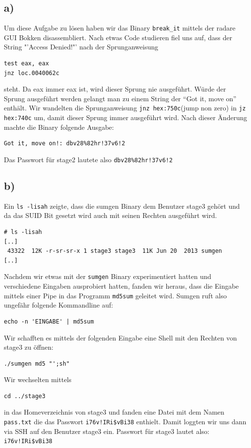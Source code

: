 \documentclass[10pt,a4paper]{article}
\begin{document}
\subsection*{a)}
Um diese Aufgabe zu lösen haben wir das Binary \texttt{break\_it} mittels der radare GUI Bokken disassembliert. Nach etwas Code studieren fiel uns auf, dass der String "'Access Denied!"' nach der Sprunganweisung 
\begin{verbatim}
test eax, eax
jnz loc.0040062c
\end{verbatim}  
steht. Da eax immer eax ist, wird dieser Sprung nie ausgeführt. Würde der Sprung ausgeführt werden gelangt man zu einem String der "`Got it, move on"' enthält. Wir wandelten die Sprunganweisung \texttt{jnz hex:750c}(jump non zero) in \texttt{jz hex:740c} um, damit dieser Sprung immer ausgeführt wird.
Nach dieser Änderung machte die Binary folgende Ausgabe:
\begin{verbatim}
Got it, move on!: dbv28%82hr!37v6!2
\end{verbatim}
Das Passwort für stage2 lautete also \texttt{dbv28\%82hr!37v6!2}

\subsection*{b)}
Ein \texttt{ls -lisah} zeigte, dass die sumgen Binary dem Benutzer stage3 gehört und da das SUID Bit gesetzt wird auch mit seinen Rechten ausgeführt wird.
\begin{verbatim}
# ls -lisah
[..]
 43322  12K -r-sr-sr-x 1 stage3 stage3  11K Jun 20  2013 sumgen
[..]
\end{verbatim}
Nachdem wir etwas mit der \texttt{sumgen} Binary experimentiert hatten und verschiedene Eingaben ausprobiert hatten, fanden wir heraus, dass die Eingabe mittels einer Pipe in das Programm \texttt{md5sum} geleitet wird.
Sumgen ruft also ungefähr folgende Kommandline auf:
\begin{verbatim}
echo -n 'EINGABE' | md5sum 
\end{verbatim}
Wir schafften es mittels der folgenden Eingabe eine Shell mit den Rechten von stage3 zu öffnen:
\begin{verbatim}
./sumgen md5 "';sh"
\end{verbatim}
Wir wechselten mittels 
\begin{verbatim}
cd ../stage3
\end{verbatim}
in das Homeverzeichnis von stage3 und fanden eine Datei mit dem Namen \texttt{pass.txt} die das Passwort \texttt{i76v!IRi\$vBi38} enthielt. Damit loggten wir uns dann via SSH auf den Benutzer stage3 ein.
Passwort für stage3 lautet also: \texttt{i76v!IRi\$vBi38}
\end{document}
